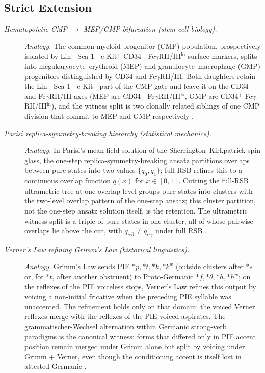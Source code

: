 \subsection*{ Strict Extension}
\begingroup\small
\begin{description}
\item[\emph{Hematopoietic CMP \(\to\) MEP/GMP bifurcation (stem-cell
biology).}] \textit{Analogy.}
The common myeloid progenitor (CMP) population, prospectively
isolated by Lin\(^{-}\) Sca-1\(^{-}\) c-Kit\(^{+}\) CD34\(^{+}\)
Fc\(\gamma\)RII/III\(^{\mathrm{lo}}\) surface markers, splits into
megakaryocyte--erythroid (MEP) and granulocyte--macrophage (GMP)
progenitors distinguished by CD34 and Fc\(\gamma\)RII/III.  Both
daughters retain the Lin\(^{-}\) Sca-1\(^{-}\) c-Kit\(^{+}\) part of
the CMP gate and leave it on the CD34 and Fc\(\gamma\)RII/III axes
(MEP are CD34\(^{-}\) Fc\(\gamma\)RII/III\(^{\mathrm{lo}}\), GMP are
CD34\(^{+}\) Fc\(\gamma\)RII/III\(^{\mathrm{hi}}\)), and the witness
split is two
clonally related siblings of one CMP division that commit to MEP and
GMP respectively \citep{AkashiTraverMiyamotoWeissman2000CMPClonogenic}.

\item[\emph{Parisi replica-symmetry-breaking hierarchy (statistical
mechanics).}] \textit{Analogy.}
In Parisi's mean-field solution of the Sherrington--Kirkpatrick spin
glass, the one-step replica-symmetry-breaking ansatz partitions
overlaps between pure states into two values \(\{q_0,q_1\}\); full RSB
refines this to a continuous overlap function \(q(x)\) for
\(x\in[0,1]\).  Cutting the full-RSB ultrametric tree at one
overlap level groups pure states into clusters with the two-level
overlap pattern of the one-step ansatz; this cluster partition, not
the one-step ansatz solution itself, is the retention.  The
ultrametric witness split is a triple of pure states in one cluster,
all of whose pairwise overlaps lie above the cut, with
\(q_{\alpha\beta}\ne q_{\alpha\gamma}\) under full RSB
\citep{Parisi1983OrderParameterSpinGlasses}.

\item[\emph{Verner's Law refining Grimm's Law (historical
linguistics).}] \textit{Analogy.}
Grimm's Law sends PIE \({*}p,{*}t,{*}k,{*}k^w\) (outside clusters after \({*}s\) or, for \({*}t\), after another obstruent) to
Proto-Germanic \({*}f,{*}\theta,{*}h,{*}h^w\); on the reflexes of the PIE voiceless stops, Verner's Law refines
this output by voicing a non-initial fricative when the preceding PIE
syllable was unaccented.  The refinement holds only on that domain:
the voiced Verner reflexes merge with the reflexes of the PIE voiced
aspirates.  The
grammatischer-Wechsel alternation within Germanic strong-verb
paradigms is the canonical witness: forms that differed only in PIE accent position remain merged under
Grimm alone but split by voicing under Grimm + Verner, even though the conditioning accent is itself
lost in attested Germanic
\citep{Verner1877AusnahmeLautverschiebung}.
\end{description}
\endgroup


